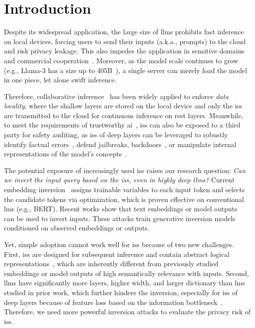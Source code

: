 \documentclass[letterpaper,twocolumn,10pt]{article}
\newcommand{\eg}{\hbox{{e.g.}}\xspace}
\newcommand{\aka}{\hbox{{a.k.a.}}\xspace}
\theoremstyle{definition}
\begin{document}
\section{Introduction}


Despite its widespread application, the large size of \acp{llm} prohibits fast inference on local devices, forcing users to send their inputs (\aka, prompts) to the cloud and risk privacy leakage.
This also impedes the application in sensitive domains and commercial cooperation~\cite{musk_ban_apple}. Moreover, as the model scale continues to grow (\eg, Llama-3 has a size up to 405B~\cite{dubey2024llama}), a single server can merely load the model in one piece, let alone swift inference.

Therefore, collaborative inference~\cite{lin2024splitlora,mei2024helix,zhang2024edgeshard} has been widely applied to enforce \textit{data locality}, where the shallow layers are stored on the local device and only the \acp{is} are transmitted to the cloud for continuous inference on rest layers.
Meanwhile, to meet the requirements of trustworthy \ac{ai}~\cite{white_house_order}, \acp{is} can also be exposed to a third party for safety auditing, as \acp{is} of deep layers can be leveraged to robustly identify factual errors~\cite{azaria-mitchell-2023-internal,chen2024inside,su-etal-2024-unsupervised,DBLP:journals/corr/abs-2406-15927,ye2024physics}, defend jailbreaks, backdoors~\cite{li2024safety,lamparth2024analyzing,dong2024trojaningplugins}, or manipulate internal representations of the model's concepts~\cite{zou2023representation,
burns2023discovering,chen2024states}.




The potential exposure of increasingly used \acp{is} raises our research question: \textit{Can we invert the input query based on the \acp{is}, even in highly deep \acp{llm}?}
Current embedding inversion~\cite{song2020information} assigns trainable variables to each input token and selects the candidate tokens via optimization, which is proven effective on conventional \acp{lm} (\eg, BERT).
Recent works show that text embeddings or model outputs~\cite{song2020information,morris-etal-2023-text,zhang2024extracting} can be used to invert inputs.
These attacks train generative inversion models conditioned on observed embeddings or outputs.

Yet, simple adoption cannot work well for \acp{is} because of two new challenges.
First, \acp{is} are designed for subsequent inference and contain abstract logical representations~\cite{chen2024states}, which are inherently different from previously studied embeddings or model outputs of high semantically relevance with inputs.
Second, \acp{llm} have significantly more layers, higher width, and larger dictionary than \acp{lm} studied in prior work, which further hinders the inversion, especially for \acp{is} of deep layers because of feature loss based on the information bottleneck~\cite{infobottleneck17}.
Therefore, we need more powerful inversion attacks to evaluate the privacy risk of \acp{is}.
\end{document}
